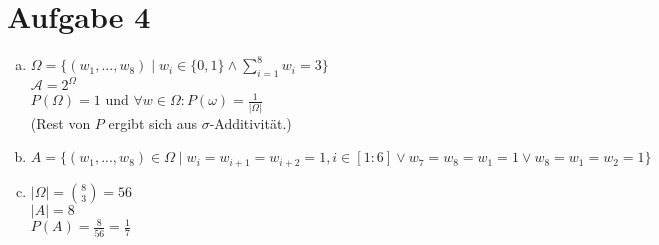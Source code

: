 \documentclass[10pt,a4paper]{article}
\begin{document}
\section*{Aufgabe 4}
\begin{enumerate}[a)]
\item
$\Omega = \{(w_1,...,w_8) \mid w_i \in \{0,1\} \land \sum \limits_{i=1}^8 w_i = 3\}$\\
$\mathcal{A} = 2^\Omega$\\
$P(\Omega)=1$ und $\forall w \in \Omega: P(\omega) = \frac{1}{|\Omega|}$ \\
(Rest von $P$ ergibt sich aus $\sigma$-Additivität.)
\item
$A =  \{(w_1,...,w_8) \in \Omega \mid w_i = w_{i+1} = w_{i+2} = 1, i \in [1:6] \lor w_7 = w_8 = w_1 = 1 \lor w_8 = w_1 = w_2 = 1\}$\\
\item
$|\Omega| = \binom{8}{3} = 56$\\
$|A|=8$ \\
$P(A) = \frac{8}{56} = \frac{1}{7}$
\end{enumerate}
\end{document}

